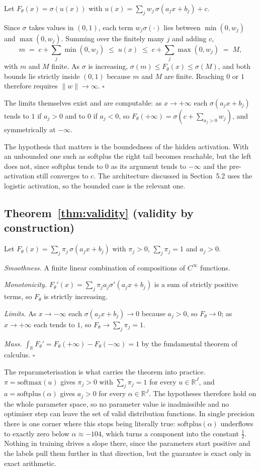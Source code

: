 \documentclass[11pt]{article}
\begin{document}
Let $F_\theta(x) = \sigma(u(x))$ with $u(x) = \sum_j w_j\, \sigma(a_j x + b_j) + c$.

Since $\sigma$ takes values in $(0,1)$, each term $w_j \sigma(\cdot)$ lies between
$\min(0, w_j)$ and $\max(0, w_j)$. Summing over the finitely many $j$ and adding $c$,
\[
m \;=\; c + \sum_j \min(0, w_j) \;\le\; u(x) \;\le\; c + \sum_j \max(0, w_j) \;=\; M ,
\]
with $m$ and $M$ finite. As $\sigma$ is increasing, $\sigma(m) \le F_\theta(x) \le \sigma(M)$,
and both bounds lie strictly inside $(0,1)$ because $m$ and $M$ are finite. Reaching $0$ or
$1$ therefore requires $\|w\| \to \infty$. \hfill$\square$

The limits themselves exist and are computable: as $x \to +\infty$ each $\sigma(a_j x + b_j)$
tends to $1$ if $a_j > 0$ and to $0$ if $a_j < 0$, so $F_\theta(+\infty) = \sigma(c + \sum_{a_j
> 0} w_j)$, and symmetrically at $-\infty$.

The hypothesis that matters is the boundedness of the hidden activation. With an unbounded one
such as softplus the right tail becomes reachable, but the left does not, since softplus tends
to $0$ as its argument tends to $-\infty$ and the pre-activation still converges to $c$. The
architecture discussed in Section~5.2 uses the logistic activation, so the bounded case is the
relevant one.

\subsection*{Theorem~\ref{thm:validity} (validity by construction)}

Let $F_\theta(x) = \sum_j \pi_j\, \sigma(a_j x + b_j)$ with $\pi_j > 0$, $\sum_j \pi_j = 1$
and $a_j > 0$.

\emph{Smoothness.} A finite linear combination of compositions of $C^\infty$ functions.

\emph{Monotonicity.} $F_\theta'(x) = \sum_j \pi_j a_j \sigma'(a_j x + b_j)$ is a sum of
strictly positive terms, so $F_\theta$ is strictly increasing.

\emph{Limits.} As $x \to -\infty$ each $\sigma(a_j x + b_j) \to 0$ because $a_j > 0$, so
$F_\theta \to 0$; as $x \to +\infty$ each tends to $1$, so $F_\theta \to \sum_j \pi_j = 1$.

\emph{Mass.} $\int_{\mathbb{R}} F_\theta' = F_\theta(+\infty) - F_\theta(-\infty) = 1$ by the
fundamental theorem of calculus. \hfill$\square$

The reparameterisation is what carries the theorem into practice. $\pi =
\mathrm{softmax}(u)$ gives $\pi_j > 0$ with $\sum_j \pi_j = 1$ for every $u \in \mathbb{R}^J$,
and $a = \mathrm{softplus}(\alpha)$ gives $a_j > 0$ for every $\alpha \in \mathbb{R}^J$. The
hypotheses therefore hold on the whole parameter space, so no parameter value is inadmissible
and no optimiser step can leave the set of valid distribution functions. In single precision
there is one corner where this stops being literally true: $\mathrm{softplus}(\alpha)$
underflows to exactly zero below $\alpha \approx -104$, which turns a component into the
constant $\tfrac12$. Nothing in training drives a slope there, since the parameters start
positive and the labels pull them further in that direction, but the guarantee is exact only
in exact arithmetic.
\end{document}
